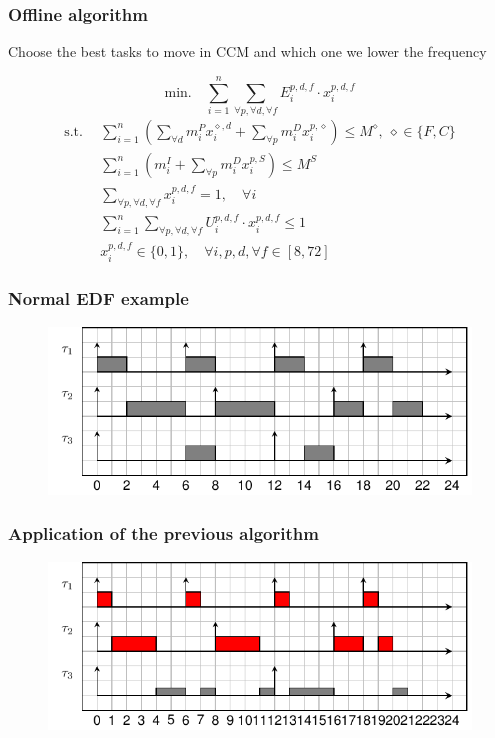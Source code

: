 \documentclass[
	11pt, %
]{beamer}
\begin{document}
\begin{frame}[fragile]
	\frametitle{Offline algorithm}
	Choose the best tasks to move in CCM and which one we lower the frequency
	
	\[ 
		\text{min.} \quad
		\sum_{i=1}^n \sum_{\forall {p}, \forall {d}, 
		\forall {f}} {E_i^{{p}, {d}, {f}} \cdot x^{{p}, {d}, {f}}_i}
		\]
	{\tiny
		\begin{align*}
			\text{s.t.}~~ & 
			\sum_{i=1}^n \left (\sum_{\forall {d}}{m^{P}_i  x^{{\diamond}, {d}}_{i}} + \sum_{\forall {p}}
			{m^{D}_i  x^{{p}, {\diamond}}_{i}} \right ) \leq M^{{\diamond}},~ \diamond \in \{F,C\} \\ 
			&\sum_{i=1}^n{\left (m^I_i + \sum_{\forall {p}}{m^{D}_i  x^{{p}, {S}}_{i}} \right )} \leq M^{{S}} \\ 
			&\sum_{\forall {p}, \forall {d}, \forall {f}}{x^{{p}, {d}, {f}}_i} = 1, \quad \forall i\\	
			&\sum_{i=1}^n \sum_{\forall {p}, \forall {d}, \forall {f}}
			{U_i^{{p}, {d}, {f}} \cdot x_i^{{p}, {d}, {f}}} \leq 1\\  
			&x^{{p}, {d}, {f}}_i \in \{0,1\}, \quad \forall {i}, {p}, {d},\forall {f} \in [8,72]		
		\end{align*}
	}
\end{frame}


\begin{frame}[fragile]
	\frametitle{ Normal EDF example }
	\begin{figure}
		\includegraphics{schedule/edf.pdf}
	\end{figure}
\end{frame}


\begin{frame}[fragile]
	\frametitle{ Application of the previous algorithm }
	\begin{figure}
		\includegraphics{schedule/offline_algo.pdf}
	\end{figure}
	
\end{frame}
\end{document}
